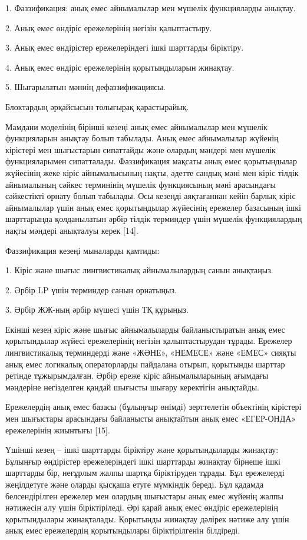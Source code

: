 \documentclass[
]{article}
\begin{document}
1. Фаззификация: анық емес айнымалылар мен мүшелік функцияларды анықтау.

2. Анық емес өндіріс ережелерінің негізін қалыптастыру.

3. Анық емес өндірістер ережелеріндегі ішкі шарттарды біріктіру.

4. Анық емес өндіріс ережелерінің қорытындыларын жинақтау.

5. Шығарылатын мәннің дефаззификациясы.

Блоктардың әрқайсысын толығырақ қарастырайық.

Мамдани моделінің бірінші кезеңі анық емес айнымалылар мен мүшелік
функцияларын анықтау болып табылады. Анық емес айнымалылар жүйенің
кірістері мен шығыстарын сипаттайды және олардың мәндері мен мүшелік
функцияларымен сипатталады. Фаззификация мақсаты анық емес қорытындылар
жүйесінің жеке кіріс айнымалысының нақты, әдетте сандық мәні мен кіріс
тілдік айнымалының сәйкес терминінің мүшелік функциясының мәні
арасындағы сәйкестікті орнату болып табылады. Осы кезеңді аяқтағаннан
кейін барлық кіріс айнымалылар үшін анық емес қорытындылар жүйесінің
ережелер базасының ішкі шарттарында қолданылатын әрбір тілдік терминдер
үшін мүшелік функциялардың нақты мәндері анықталуы керек {[}14{]}.

Фаззификация кезеңі мыналарды қамтиды:

1. Кіріс және шығыс лингвистикалық айнымалылардың санын анықтаңыз.

2. Әрбір LP үшін терминдер санын орнатыңыз.

3. Әрбір ЖЖ-ның әрбір мүшесі үшін ТҚ құрыңыз.

Екінші кезең кіріс және шығыс айнымалыларды байланыстыратын анық емес
қорытындылар жүйесі ережелерінің негізін қалыптастырудан тұрады.
Ережелер лингвистикалық терминдерді және «ЖӘНЕ», «НЕМЕСЕ» және «ЕМЕС»
сияқты анық емес логикалық операторларды пайдалана отырып, қорытынды
шарттар ретінде тұжырымдалған. Әрбір ереже кіріс айнымалыларының
ағымдағы мәндеріне негізделген қандай шығысты шығару керектігін
анықтайды.

Ережелердің анық емес базасы (бұлыңғыр өнімді) зерттелетін объектінің
кірістері мен шығыстары арасындағы байланысты анықтайтын анық емес
«ЕГЕР-ОНДА» ережелерінің жиынтығы {[}15{]}.

Үшінші кезең -- ішкі шарттарды біріктіру және қорытындыларды жинақтау:
Бұлыңғыр өндірістер ережелеріндегі ішкі шарттарды жинақтау бірнеше ішкі
шарттарды бір, неғұрлым жалпы шартқа біріктіруден тұрады. Бұл ережелерді
жеңілдетуге және оларды қысқаша етуге мүмкіндік береді. Бұл қадамда
белсендірілген ережелер мен олардың шығыстары анық емес жүйенің жалпы
нәтижесін алу үшін біріктіріледі. Әрі қарай анық емес өндіріс
ережелерінің қорытындылары жинақталады. Қорытынды жинақтау дәлірек
нәтиже алу үшін анық емес ережелердің қорытындылары біріктірілгенін
білдіреді.
\end{document}
